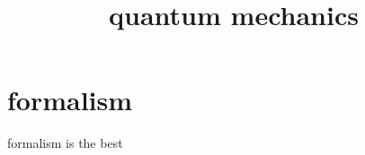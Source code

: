 \documentclass{article}
\begin{document}
\title{quantum mechanics}
\section{formalism}
formalism is the best
\end{document}
